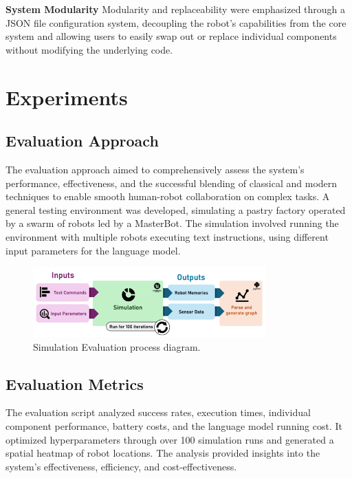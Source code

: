 \documentclass[pdflatex,sn-mathphys-num]{sn-jnl}%
\theoremstyle{thmstyleone}%
\theoremstyle{thmstyletwo}%
\theoremstyle{thmstylethree}%
\begin{document}
\textbf{System Modularity}
Modularity and replaceability were emphasized through a JSON file configuration system, decoupling the robot's capabilities from the core system and allowing users to easily swap out or replace individual components without modifying the underlying code.

\section{Experiments}
\subsection{Evaluation Approach}
The evaluation approach aimed to comprehensively assess the system's performance, effectiveness, and the successful blending of classical and modern techniques to enable smooth human-robot collaboration on complex tasks. A general testing environment was developed, simulating a pastry factory operated by a swarm of robots led by a MasterBot. The simulation involved running the environment with multiple robots executing text instructions, using different input parameters for the language model.\cite{benjamin2007cognitive}
\begin{figure}[h]
\centering
\includegraphics[width=0.8\textwidth]{figures/Picture4.png}
\caption{Simulation Evaluation process diagram.}\label{fig10}
\end{figure}
\subsection{Evaluation Metrics}
The evaluation script analyzed success rates, execution times, individual component performance, battery costs, and the language model running cost. It optimized hyperparameters through over 100 simulation runs and generated a spatial heatmap of robot locations. The analysis provided insights into the system's effectiveness, efficiency, and cost-effectiveness.
\end{document}
